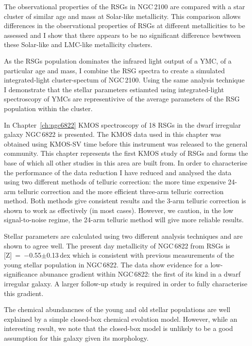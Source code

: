 The observational properties of the RSGs in NGC\,2100 are compared with a star cluster of similar age and mass at Solar-like metallicity.
This comparison allows differences in the observational properties of RSGs at different metallicities to be assessed and I show that there appears to be no significant difference bewtween these Solar-like and LMC-like metallicity clusters.

As the RSGs population dominates the infrared light output of a YMC, of a particular age and mass, I combine the RSG spectra to create a simulated integrated-light cluster-spectum of NGC\,2100.
Using the same analysis technique I demonstrate that the stellar parameters estiamted using integrated-light spectroscopy of YMCs are representivive of the average parameters of the RSG population within the cluster.

In Chapter~\ref{ch:ngc6822} KMOS spectroscopy of 18 RSGs in the dwarf irregular galaxy NGC\,6822 is presented.
The KMOS data used in this chapter was obtained using KMOS-SV time before this instrument was released to the general community.
This chapter represents the first KMOS study of RSGs and forms the base of which all other studies in this area are built from.
In order to characterise the performance of the data reduction I have reduced and analysed the data using two different methods of telluric correction: the more time expensive 24-arm telluric correction and the more efficient three-arm telluric correction method.
Both methods give consistent results and the 3-arm telluric correction is shown to work as effectively (in most cases).
However, we caution, in the low signal-to-noise regime, the 24-arm telluric method will give more reliable results.

Stellar parameters are calculated using two different analysis techniques and are shown to agree well.
The present day metallicity of NGC\,6822 from RSGs is
[Z]~=~$-$0.55$\pm$0.13\,dex which is consistent with previous measurements of the young stellar population in NGC\,6822.
The data show evidence for a low-significance abunance gradient within NGC\,6822: the first of its kind in a dwarf irregular galaxy.
A larger follow-up study is required in order to fully characterise this gradient.

The chemical abundancnes of the young and old stellar populations are well explained by a simple closed-box chemical evolution model.
However, while an interesting result, we note that the closed-box model is unlikely to be a good assumption for this galaxy given its morphology.

